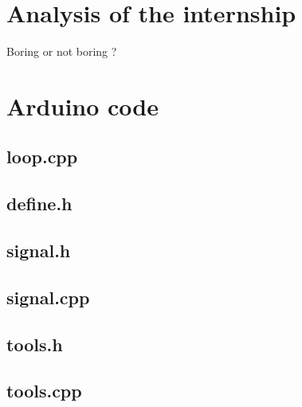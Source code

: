 \documentclass[12pt]{report}
\begin{document}
\chapter{Analysis of the internship}

Boring or not boring ?












\appendix

\chapter{Arduino code}

\section{loop.cpp}



\section{define.h}



\section{signal.h}



\section{signal.cpp}



\section{tools.h}



\section{tools.cpp}


\end{document}
